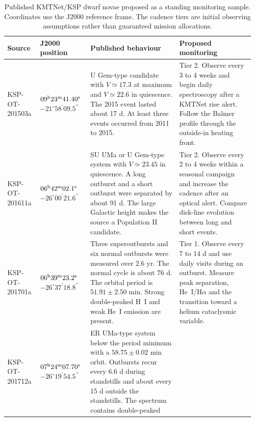 \documentclass[10pt,onecolumn]{article}
\begin{document}
\begin{table}[H]
\centering
\small
\caption{Published KMTNet/KSP dwarf novae proposed as a standing monitoring
sample. Coordinates use the J2000 reference frame. The cadence tiers are
initial observing assumptions rather than guaranteed mission allocations.}
\label{tab:ksp_dwarf_novae}
\begin{tabularx}{\textwidth}{@{}P{28mm} P{31mm} P{57mm} Y@{}}
\toprule
\textbf{Source} & \textbf{J2000 position} & \textbf{Published behaviour} &
\textbf{Proposed monitoring}\\
\midrule
KSP-OT-201503a \cite{brown2018ksp} &
$09^{\rm h}23^{\rm m}41.40^{\rm s}$\newline
$-21^\circ58^\prime09.5^{\prime\prime}$ &
U Gem-type candidate with $V\simeq17.3$ at maximum and $V\simeq22.6$ in
quiescence. The 2015 event lasted about 17 d. At least three events occurred
from 2011 to 2015. &
Tier 2. Observe every 3 to 4 weeks and begin daily spectroscopy after a
KMTNet rise alert. Follow the Balmer profile through the outside-in heating
front.\\
KSP-OT-201611a \cite{lee2019ksp} &
$06^{\rm h}42^{\rm m}02.1^{\rm s}$\newline
$-26^\circ00^\prime21.6^{\prime\prime}$ &
SU UMa or U Gem-type system with $V\simeq23.45$ in quiescence. A long
outburst and a short outburst were separated by about 91 d. The large
Galactic height makes the source a Population II candidate. &
Tier 2. Observe every 2 to 4 weeks within a seasonal campaign and increase
the cadence after an optical alert. Compare disk-line evolution between long
and short events.\\
KSP-OT-201701a \cite{lee2022ksp} &
$06^{\rm h}39^{\rm m}23.2^{\rm s}$\newline
$-26^\circ37^\prime18.8^{\prime\prime}$ &
Three superoutbursts and six normal outbursts were measured over 2.6 yr.
The normal cycle is about 76 d. The orbital period is
$51.91\pm2.50$ min. Strong double-peaked H~I and weak He~I emission are
present. &
Tier 1. Observe every 7 to 14 d and use daily visits during an outburst.
Measure peak separation, He~I/H$\alpha$ and the transition toward a
helium cataclysmic variable.\\
KSP-OT-201712a \cite{lee2024ksp} &
$07^{\rm h}24^{\rm m}07.70^{\rm s}$\newline
$-26^\circ19^\prime54.5^{\prime\prime}$ &
ER UMa-type system below the period minimum with a
$58.75\pm0.02$ min orbit. Outbursts recur every 6.6 d during standstills and
about every 15 d outside the standstills. The spectrum contains double-peaked

\end{tabularx}
\end{table}
\end{document}
